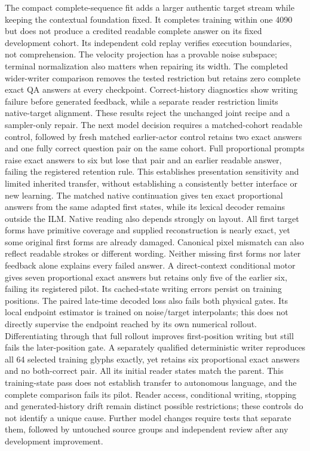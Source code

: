 \documentclass[12pt,a4paper]{article}
\providecommand{\DIFadd}[1]{{\protect\color{blue} \sf #1}} %
\providecommand{\DIFdel}[1]{{\protect\color{red} \scriptsize #1}} %
\providecommand{\DIFaddbegin}{} %
\providecommand{\DIFaddend}{} %
\providecommand{\DIFdelbegin}{} %
\providecommand{\DIFdelend}{} %
\begin{document}
The compact complete-sequence fit adds a larger authentic target stream while
keeping the contextual foundation fixed. It completes training within one
4090 but does not produce a credited readable complete answer on its fixed
development cohort. Its independent cold replay verifies execution boundaries,
not comprehension. The velocity projection has a provable noise subspace;
terminal normalization also matters when repairing its width. The completed
wider-writer comparison removes the tested restriction but retains zero
complete exact QA answers at every checkpoint. Correct-history diagnostics
show writing failure before generated feedback, while a separate reader
restriction limits native-target alignment. These results reject the unchanged
joint recipe and a sampler-only repair. The \DIFdelbegin \DIFdel{next model decision requires a matched-cohort readable control, followed by fresh }\DIFdelend \DIFaddbegin \DIFadd{matched earlier-actor control
retains two exact answers and one fully correct question pair on the same
cohort. Full proportional prompts raise exact answers to six but lose that
pair and an earlier readable answer, failing the registered retention rule.
This establishes presentation sensitivity and limited inherited transfer,
without establishing a consistently better interface or new learning.
The matched native continuation gives ten exact proportional answers from
the same adapted first states, while its lexical decoder remains outside the
ILM. Native reading also depends strongly on layout. All first target forms
have primitive coverage and supplied reconstruction is nearly exact, yet some
original first forms are already damaged. Canonical pixel mismatch can also
reflect readable strokes or different wording. Neither missing first forms
nor later feedback alone explains every failed answer. A direct-context
conditional motor gives seven proportional exact answers but retains only
five of the earlier six, failing its registered pilot. Its cached-state
writing errors persist on training positions. The paired late-time decoded
loss also fails both physical gates. Its local endpoint estimator is trained
on noise/target interpolants; this does not directly supervise the endpoint
reached by its own numerical rollout. Differentiating through that full
rollout improves first-position writing but still fails the later-position
gate. A separately qualified deterministic writer reproduces all 64 selected
training glyphs exactly, yet retains six proportional exact answers and no
both-correct pair. All its initial reader states match the parent. This
training-state pass does not establish transfer to autonomous language, and
the complete comparison fails its pilot. Reader access, conditional writing,
stopping and generated-history drift remain distinct possible restrictions;
these controls do not identify a unique cause. Further model changes require
tests that separate them, followed by untouched }\DIFaddend source groups and independent
review after any development improvement.
\end{document}
